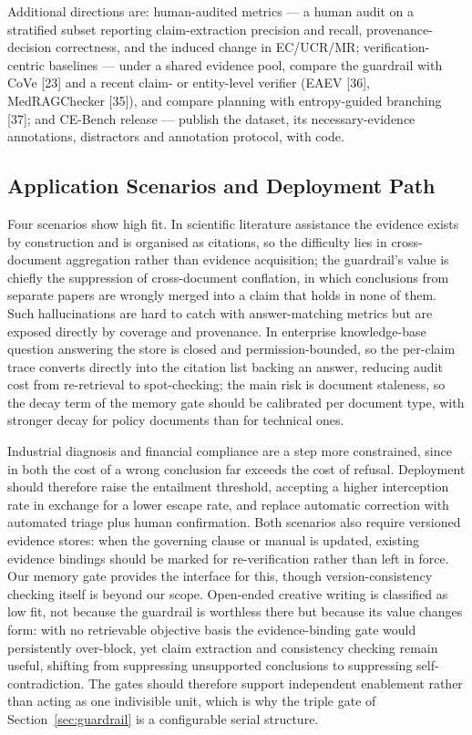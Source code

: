 \documentclass[journal,10pt,a4paper]{IEEEtran}
\begin{document}
Additional directions are: human-audited metrics --- a human audit on a stratified subset reporting claim-extraction precision and recall, provenance-decision correctness, and the induced change in EC/UCR/MR; verification-centric baselines --- under a shared evidence pool, compare the guardrail with CoVe [23] and a recent claim- or entity-level verifier (EAEV [36], MedRAGChecker [35]), and compare planning with entropy-guided branching [37]; and CE-Bench release --- publish the dataset, its necessary-evidence annotations, distractors and annotation protocol, with code.

\subsection{Application Scenarios and Deployment Path}
Four scenarios show high fit. In scientific literature assistance the evidence exists by construction and is organised as citations, so the difficulty lies in cross-document aggregation rather than evidence acquisition; the guardrail's value is chiefly the suppression of cross-document conflation, in which conclusions from separate papers are wrongly merged into a claim that holds in none of them. Such hallucinations are hard to catch with answer-matching metrics but are exposed directly by coverage and provenance. In enterprise knowledge-base question answering the store is closed and permission-bounded, so the per-claim trace converts directly into the citation list backing an answer, reducing audit cost from re-retrieval to spot-checking; the main risk is document staleness, so the decay term of the memory gate should be calibrated per document type, with stronger decay for policy documents than for technical ones.

Industrial diagnosis and financial compliance are a step more constrained, since in both the cost of a wrong conclusion far exceeds the cost of refusal. Deployment should therefore raise the entailment threshold, accepting a higher interception rate in exchange for a lower escape rate, and replace automatic correction with automated triage plus human confirmation. Both scenarios also require versioned evidence stores: when the governing clause or manual is updated, existing evidence bindings should be marked for re-verification rather than left in force. Our memory gate provides the interface for this, though version-consistency checking itself is beyond our scope. Open-ended creative writing is classified as low fit, not because the guardrail is worthless there but because its value changes form: with no retrievable objective basis the evidence-binding gate would persistently over-block, yet claim extraction and consistency checking remain useful, shifting from suppressing unsupported conclusions to suppressing self-contradiction. The gates should therefore support independent enablement rather than acting as one indivisible unit, which is why the triple gate of Section~\ref{sec:guardrail} is a configurable serial structure.
\end{document}
